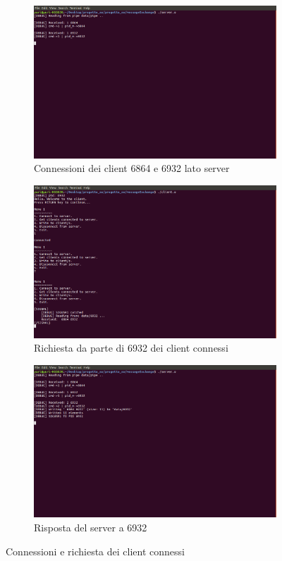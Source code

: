 \documentclass[a4paper]{article}
\begin{document}
\begin{figure}
\centering
\begin{subfigure}[b]{0.7\textwidth}
\includegraphics[width=\textwidth]{screenmsg/5_server}
\caption{Connessioni dei client 6864 e 6932 lato server}
\end{subfigure}
\begin{subfigure}[b]{0.7\textwidth}
\includegraphics[width=\textwidth]{screenmsg/6_client_6932}
\caption{Richiesta da parte di 6932 dei client connessi}
\end{subfigure}
\begin{subfigure}[b]{0.7\textwidth}
\includegraphics[width=\textwidth]{screenmsg/7_server}
\caption{Risposta del server a 6932}
\end{subfigure}
\caption{Connessioni e richiesta dei client connessi}
\end{figure}
\end{document}
